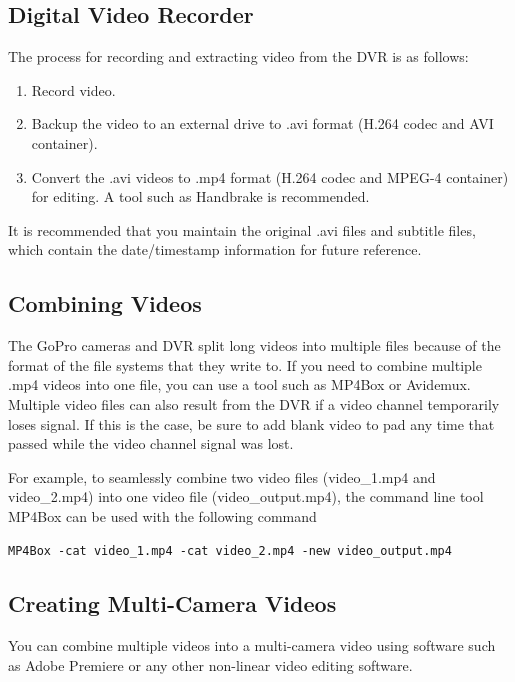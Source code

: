 \documentclass[11pt,oneside]{book}
\begin{document}
\subsection{Digital Video Recorder}

The process for recording and extracting video from the DVR is as follows:
\begin{enumerate}
\item Record video.
\item Backup the video to an external drive to .avi format (H.264 codec and AVI container).
\item Convert the .avi videos to .mp4 format (H.264 codec and MPEG-4 container) for editing. A tool such as Handbrake is recommended.
\end{enumerate}
It is recommended that you maintain the original .avi files and subtitle files, which contain the date/timestamp information for future reference.

\subsection{Combining Videos}

The GoPro cameras and DVR split long videos into multiple files because of the format of the file systems that they write to. If you need to combine multiple .mp4 videos into one file, you can use a tool such as MP4Box or Avidemux. Multiple video files can also result from the DVR if a video channel temporarily loses signal. If this is the case, be sure to add blank video to pad any time that passed while the video channel signal was lost.

For example, to seamlessly combine two video files (video\_1.mp4 and video\_2.mp4) into one video file (video\_output.mp4), the command line tool MP4Box can be used with the following command

\begin{verbatim}
MP4Box -cat video_1.mp4 -cat video_2.mp4 -new video_output.mp4
\end{verbatim}

\subsection{Creating Multi-Camera Videos}

You can combine multiple videos into a multi-camera video using software such as Adobe Premiere or any other non-linear video editing software.
\end{document}
